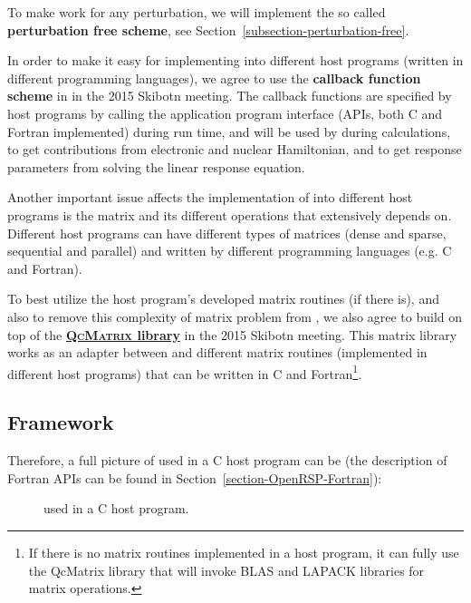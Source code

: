 To make \LibName work for any perturbation, we will implement the so called
\textbf{perturbation free scheme}, see Section~\ref{subsection-perturbation-free}.

In order to make it easy for implementing \LibName into different host programs
(written in different programming languages), we agree to use the
\textbf{callback function scheme} in \LibName
in the 2015 Skibotn meeting. The callback functions are specified by host
programs by calling the \LibName application program interface (APIs, both C
and Fortran implemented) during run time, and will be used by \LibName during
calculations, to get contributions from electronic and nuclear Hamiltonian, and
to get response parameters from solving the linear response equation.

Another important issue affects the implementation of \LibName into different
host programs is the matrix and its different operations that \LibName
extensively depends on. Different host programs can have different types of
matrices (dense and sparse, sequential and parallel) and written by different
programming languages (e.g. C and Fortran).

To best utilize the host program's developed matrix routines (if there is), and
also to remove this complexity of matrix problem from \LibName, we also agree
to build \LibName on top of the
\href{https://gitlab.com/bingao/qcmatrix}{\textbf{\textsc{QcMatrix} library}}
in the 2015 Skibotn meeting. This matrix library works as an adapter between
\LibName and different matrix routines (implemented in different host programs)
that can be written in C and Fortran\footnote{If there is no matrix routines
implemented in a host program, it can fully use the QcMatrix library that will
invoke BLAS and LAPACK libraries for matrix operations.}.

\subsection{\LibName Framework}

Therefore, a full picture of \LibName used in a C host program can be (the
description of \LibName Fortran APIs can be found in
Section~\ref{section-OpenRSP-Fortran}):

\begin{figure}[hbt]
  \centering
  \scalebox{0.7}{}
  \caption{\LibName used in a C host program.}
  \label{fig-openrsp-framework}
\end{figure}

